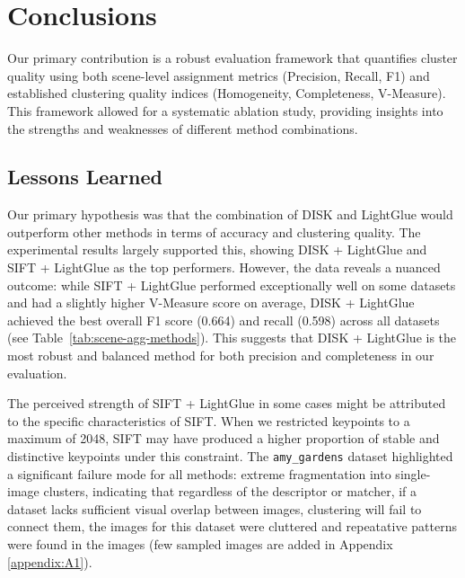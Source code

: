 \documentclass[report.tex]{subfiles}
\begin{document}
    \chapter{Conclusions}





 Our primary contribution is a robust evaluation framework that quantifies cluster quality using both scene-level assignment metrics (Precision, Recall, F1) and established clustering quality indices (Homogeneity, Completeness, V-Measure). This framework allowed for a systematic ablation study, providing insights into the strengths and weaknesses of different method combinations.

\section{Lessons Learned}
Our primary hypothesis was that the combination of DISK and LightGlue would outperform other methods in terms of accuracy and clustering quality. The experimental results largely supported this, showing DISK + LightGlue and SIFT + LightGlue as the top performers. However, the data reveals a nuanced outcome: while SIFT + LightGlue performed exceptionally well on some datasets and had a slightly higher V-Measure score on average, DISK + LightGlue achieved the best overall F1 score (0.664) and recall (0.598) across all datasets (see Table~\ref{tab:scene-agg-methods}). This suggests that DISK + LightGlue is the most robust and balanced method for both precision and completeness in our evaluation.

The perceived strength of SIFT + LightGlue in some cases might be attributed to the specific characteristics of SIFT. When we restricted keypoints to a maximum of 2048, SIFT may have produced a higher proportion of stable and distinctive keypoints under this constraint. The \texttt{amy\_gardens} dataset highlighted a significant failure mode for all methods: extreme fragmentation into single-image clusters, indicating that regardless of the descriptor or matcher, if a dataset lacks sufficient visual overlap between images, clustering will fail to connect them, the images for this dataset were cluttered and repeatative patterns were found in the images (few sampled images are added in Appendix \ref{appendix:A1}).
\end{document}
